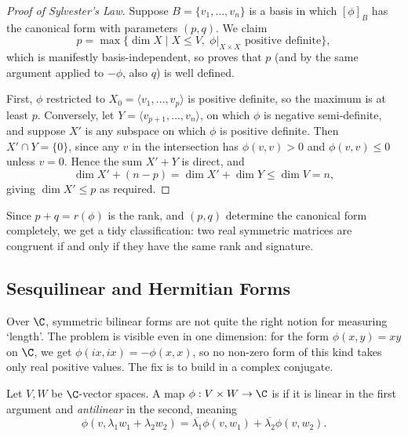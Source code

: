 \begin{proof}[Proof of Sylvester's Law]
    Suppose $B = \{v_1, \dots, v_n\}$ is a basis in which $[\phi]_B$ has the canonical form with parameters $(p, q)$. We claim
    $$
    p = \max \{\dim X \mid X \leq V, \; \phi|_{X \times X} \text{ positive definite}\},
    $$
    which is manifestly basis-independent, so proves that $p$ (and by the same argument applied to $-\phi$, also $q$) is well defined.

    First, $\phi$ restricted to $X_0 = \langle v_1, \dots, v_p \rangle$ is positive definite, so the maximum is at least $p$. Conversely, let $Y = \langle v_{p +1}, \dots, v_n\rangle$, on which $\phi$ is negative semi-definite, and suppose $X'$ is any subspace on which $\phi$ is positive definite. Then $X' \cap Y = \{0\}$, since any $v$ in the intersection has $\phi(v,v) > 0$ and $\phi(v,v) \leq 0$ unless $v = 0$. Hence the sum $X' + Y$ is direct, and
    $$
    \dim X' + (n - p) = \dim X' + \dim Y \leq \dim V = n,
    $$
    giving $\dim X' \leq p$ as required.
\end{proof}

\begin{remark}
    Since $p + q = r(\phi)$ is the rank, and $(p, q)$ determine the canonical form completely, we get a tidy classification: two real symmetric matrices are congruent if and only if they have the same rank and signature.
\end{remark}

\subsection{Sesquilinear and Hermitian Forms}

Over $\C$, symmetric bilinear forms are not quite the right notion for measuring `length'. The problem is visible even in one dimension: for the form $\phi(x, y) = xy$ on $\C$, we get $\phi(ix, ix) = -\phi(x,x)$, so no non-zero form of this kind takes only real positive values. The fix is to build in a complex conjugate.

\begin{definition}
    Let $V, W$ be $\C$-vector spaces. A map $\phi: V \times W \rightarrow \C$ is  if it is linear in the first argument and \emph{antilinear} in the second, meaning
    $$
    \phi(v, \lambda_1 w_1 + \lambda_2 w_2) = \overline{\lambda_1}\phi(v, w_1) + \overline{\lambda_2}\phi(v, w_2).
    $$
\end{definition}

